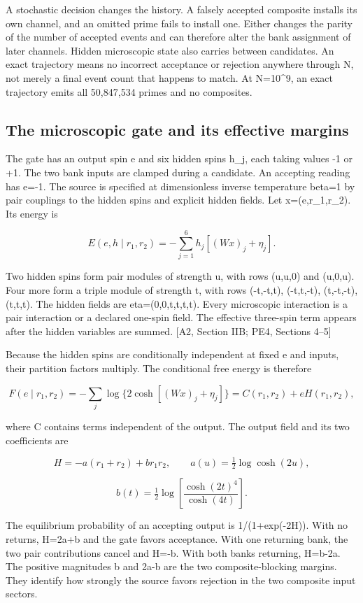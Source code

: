 A stochastic decision changes the history. A falsely accepted composite installs its own channel, and an omitted prime fails to install one. Either changes the parity of the number of accepted events and can therefore alter the bank assignment of later channels. Hidden microscopic state also carries between candidates. An exact trajectory means no incorrect acceptance or rejection anywhere through N, not merely a final event count that happens to match. At N=10\^{}9, an exact trajectory emits all 50,847,534 primes and no composites.

\subsection{The microscopic gate and its effective margins}\label{the-microscopic-gate-and-its-effective-margins}

The gate has an output spin e and six hidden spins h\_j, each taking values -1 or +1. The two bank inputs are clamped during a candidate. An accepting reading has e=-1. The source is specified at dimensionless inverse temperature beta=1 by pair couplings to the hidden spins and explicit hidden fields. Let x=(e,r\_1,r\_2). Its energy is

\[E(e,h\mid r_1,r_2)=-\sum_{j=1}^{6}h_j[(Wx)_j+\eta_j].\]

Two hidden spins form pair modules of strength u, with rows (u,u,0) and (u,0,u). Four more form a triple module of strength t, with rows (-t,-t,t), (-t,t,-t), (t,-t,-t), (t,t,t). The hidden fields are eta=(0,0,t,t,t,t). Every microscopic interaction is a pair interaction or a declared one-spin field. The effective three-spin term appears after the hidden variables are summed. {[}A2, Section IIB; PE4, Sections 4--5{]}

Because the hidden spins are conditionally independent at fixed e and inputs, their partition factors multiply. The conditional free energy is therefore

\[F(e\mid r_1,r_2)=-\sum_j\log\{2\cosh[(Wx)_j+\eta_j]\}=C(r_1,r_2)+eH(r_1,r_2),\]

where C contains terms independent of the output. The output field and its two coefficients are

\[H=-a(r_1+r_2)+br_1r_2,\qquad a(u)=\tfrac12\log\cosh(2u),\]

\[b(t)=\tfrac12\log\!\left[\frac{\cosh(2t)^4}{\cosh(4t)}\right].\]

The equilibrium probability of an accepting output is 1/(1+exp(-2H)). With no returns, H=2a+b and the gate favors acceptance. With one returning bank, the two pair contributions cancel and H=-b. With both banks returning, H=b-2a. The positive magnitudes b and 2a-b are the two composite-blocking margins. They identify how strongly the source favors rejection in the two composite input sectors.

